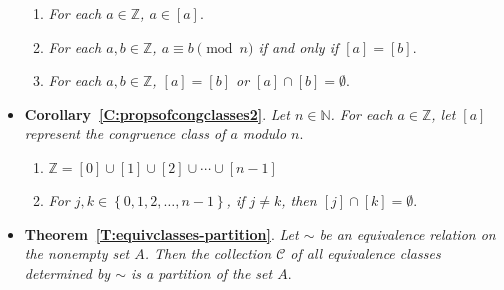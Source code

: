 \begin{itemize}
\begin{enumerate}
\item \emph{For each  $a \in \mathbb{Z}$,  $a \in \left[ a \right]$}.

\item \emph{For each  $a, b \in \mathbb{Z}$, $ a \equiv  b \pmod n$ if and only if   $\left[ a \right] = \left[ b \right]$}.

\item \emph{For each  $a, b \in \mathbb{Z}$, $\left[ a \right] = \left[ b \right]$  or  
$\left[ a \right] \cap \left[ b \right] = \emptyset$}.
\end{enumerate}

\item \textbf{Corollary~\ref{C:propsofcongclasses2}}.
\emph{Let  $n \in \mathbb{N}$.  For each  $a \in \mathbb{Z}$, let  $\left[ a \right]$ represent the congruence class of  $a$  modulo  $n$}.

\begin{enumerate}
\item \emph{$\mathbb{Z} = \left[ 0 \right] \cup \left[ 1 \right] \cup \left[ 2 \right] \cup   \cdots  \cup  \left[ {n - 1} \right]$}

\item \emph{For $j, k \in \left\{ {0, 1, 2,  \ldots , n - 1} \right\}$, if  $j \ne k$, then  
$\left[ j \right] \cap \left[ k \right] = \emptyset$}.
\end{enumerate}



\item \textbf{Theorem~\ref{T:equivclasses-partition}}.
\emph{Let  $\sim$  be an equivalence relation on the nonempty set  $A$.  Then the  collection  $\mathcal{C}$  of all equivalence classes determined by  $\sim$  is a partition of the set  $A$}.
\end{itemize}
\hbreak

\endinput
